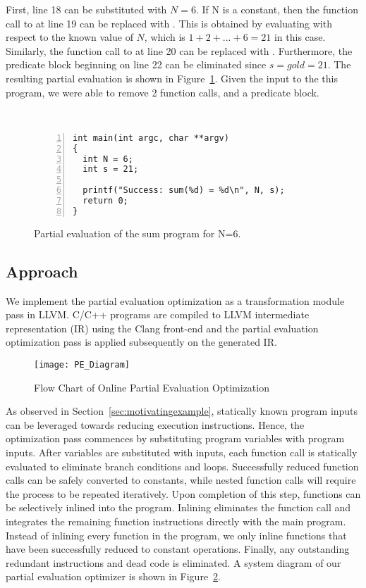 First, line 18 can be substituted with $N = 6$.
If N is a constant, then the function call to  at line 19 can be replaced with .
This is obtained by evaluating  with respect to the known value of $N$, which is $1 + 2 + ... + 6 = 21$ in this case. 
Similarly, the function call to  at line 20 can be replaced with .
Furthermore, the predicate block beginning on line 22 can be eliminated since $s = gold = 21$.
The resulting partial evaluation is shown in Figure~\ref{fig:pe_sum}.
Given the input to the this program, we were able to remove 2 function calls, and a predicate block.

\begin{figure}[htbp]\
\begin{Verbatim}[frame=single,fontsize={\scriptsize},numbers=left,numbersep=5pt,xleftmargin=10pt]
int main(int argc, char **argv)
{
  int N = 6;
  int s = 21;

  printf("Success: sum(%d) = %d\n", N, s);
  return 0;
}
\end{Verbatim}
\caption{Partial evaluation of the sum program for N=6.}
\label{fig:pe_sum}
\end{figure}

\subsection{Approach}

We implement the partial evaluation optimization as a transformation module pass in LLVM.
C/C++ programs are compiled to LLVM intermediate representation (IR) using the Clang front-end and the partial evaluation optimization pass is applied subsequently on the generated IR.

\begin{figure}[htbp]
  \centering
  \texttt{[image: PE\_Diagram]}
  \caption{Flow Chart of Online Partial Evaluation Optimization}
  \label{fig:pe_diagram}
\end{figure}

As observed in Section~\ref{sec:motivatingexample}, statically known program inputs can be leveraged towards reducing execution instructions. 
Hence, the optimization pass commences by substituting program variables with program inputs.
After variables are substituted with inputs, each function call is statically evaluated to eliminate branch conditions and loops.
Successfully reduced function calls can be safely converted to constants, while nested function calls will require the process to be repeated iteratively. 
Upon completion of this step, functions can be selectively inlined into the program.
Inlining eliminates the function call and integrates the remaining function instructions directly with the main program.
Instead of inlining every function in the program, we only inline functions that have been successfully reduced to constant operations.
Finally, any outstanding redundant instructions and dead code is eliminated.
A system diagram of our partial evaluation optimizer is shown in Figure~\ref{fig:pe_diagram}.

